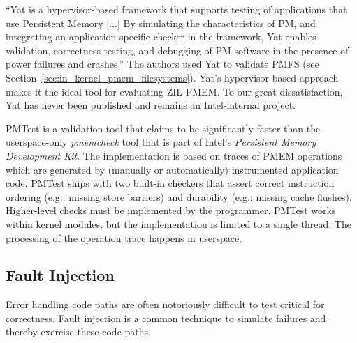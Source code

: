 \documentclass[12pt,a4paper,twoside]{book}
\begin{document}
“Yat is a hypervisor-based framework that supports testing of applications that use Persistent Memory [...]
By simulating the characteristics of PM, and integrating an application-specific checker in the framework, Yat enables validation, correctness testing, and debugging of PM software in the presence of power failures and crashes.”
The authors used Yat to validate PMFS (see Section~\ref{sec:in_kernel_pmem_filesystems}).
Yat's hypervisor-based approach makes it the ideal tool for evaluating ZIL-PMEM.
To our great dissatisfaction, Yat has never been published and remains an Intel-internal project.

PMTest is a validation tool that claims to be significantly faster than the userspace-only \textit{pmemcheck} tool that is part of Intel's \textit{Persistent Memory Development Kit}.
The implementation is based on traces of PMEM operations which are generated by (manually or automatically) instrumented application code.
PMTest ships with two built-in checkers that assert correct instruction ordering (e.g.: missing store barriers) and durability (e.g.: missing cache flushes).
Higher-level checks must be implemented by the programmer.
PMTest works within kernel modules, but the implementation is limited to a single thread.
The processing of the operation trace happens in userspace.

\subsection{Fault Injection}\label{sec:rel_work:fault_injection}
Error handling code paths are often notoriously difficult to test critical for correctness.
Fault injection is a common technique to simulate failures and thereby exercise these code paths.
\end{document}

